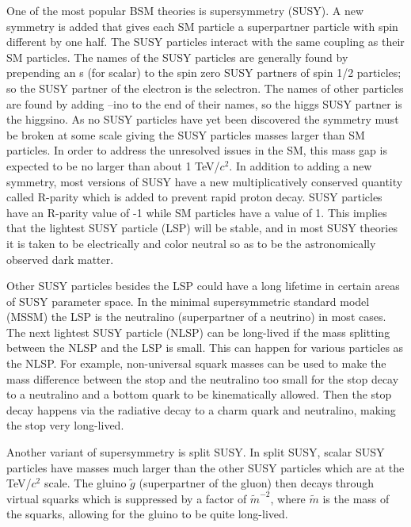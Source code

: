 One of the most popular BSM theories is supersymmetry (SUSY). A new symmetry is added that gives
each SM particle a superpartner particle with spin different by one half. The SUSY particles interact with the same coupling as their SM particles.
The names of the SUSY particles are generally found by prepending an s (for scalar) to the spin zero SUSY partners of spin 1/2 particles;
so the SUSY partner of the electron is the selectron. The names of other particles are found by adding --ino to the end of their names,
so the higgs SUSY partner is the higgsino.
As no SUSY particles have yet been discovered the
symmetry must be broken at some scale giving the SUSY particles masses larger than SM particles. In order to address the unresolved issues in the SM, this mass gap is
expected to be no larger than about 1 TeV/$c^2$. In addition to adding a new symmetry, most versions of SUSY have a new multiplicatively conserved quantity called R-parity
which is added to prevent rapid proton decay.
SUSY particles have an R-parity value of -1 while SM particles have a value of 1. This implies that the lightest SUSY particle (LSP) will be stable, and in most
SUSY theories it is taken to be electrically and color neutral so as to be the astronomically observed dark matter.

Other SUSY particles besides the LSP could have a long lifetime in certain areas of SUSY parameter space. In the minimal supersymmetric standard model (MSSM) the LSP is the
neutralino (superpartner of a neutrino) in most cases. The next lightest SUSY particle (NLSP) can be long-lived if the mass splitting between the NLSP and the LSP is small.
This can happen for various particles as the NLSP. 
For example, non-universal squark masses can be used to make the mass difference between the stop and the neutralino too small for the stop decay to a neutralino and
a bottom quark to be kinematically allowed.
Then the stop decay happens via the radiative decay to a charm quark and neutralino, making the stop very long-lived.

Another variant of supersymmetry is split SUSY. In split SUSY, scalar SUSY particles have masses much larger than the other SUSY particles which are at the TeV/$c^2$ scale.
The gluino $\tilde{g}$ (superpartner of the gluon) then decays through virtual squarks which 
is suppressed by a factor of $\tilde{m}^{-2}$, where $\tilde{m}$ is the mass of the squarks, allowing for the gluino to be quite long-lived.

